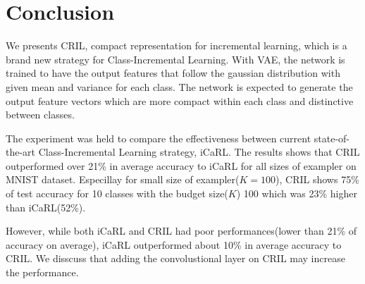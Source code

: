 \section{Conclusion}
\label{sec:conclusion}

We presents CRIL, compact representation for incremental learning, which is a brand new strategy for Class-Incremental Learning. With VAE, the network is trained to have the output features that follow the gaussian distribution with given mean and variance for each class. The network is expected to generate the output feature vectors which are more compact within each class and distinctive between classes.

The experiment was held to compare the effectiveness between current state-of-the-art Class-Incremental Learning strategy, iCaRL. The results shows that CRIL outperformed over 21\% in average accuracy to iCaRL for all sizes of exampler on MNIST dataset. Especillay for small size of exampler($K=100$), CRIL shows 75\% of test accuracy for 10 classes with the budget size($K$) 100 which was 23\% higher than iCaRL(52\%).

However, while both iCaRL and CRIL had poor performances(lower than 21\% of accuracy on average), iCaRL outperformed about 10\% in average accuracy to CRIL. We disscuss that adding the convolustional layer on CRIL may increase the performance.


